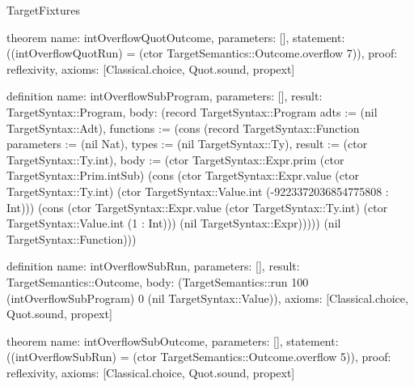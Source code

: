 \begin{lexlean}{TargetFixtures}
\begin{semanticmodule}
theorem{
  name: intOverflowQuotOutcome,
  parameters: [],
  statement: ((intOverflowQuotRun) = (ctor TargetSemantics::Outcome.overflow 7)),
  proof: reflexivity{},
  axioms: [Classical.choice, Quot.sound, propext]
}

definition{
  name: intOverflowSubProgram,
  parameters: [],
  result: TargetSyntax::Program,
  body: (record TargetSyntax::Program {adts := (nil TargetSyntax::Adt), functions := (cons (record TargetSyntax::Function {parameters := (nil Nat), types := (nil TargetSyntax::Ty), result := (ctor TargetSyntax::Ty.int), body := (ctor TargetSyntax::Expr.prim (ctor TargetSyntax::Prim.intSub) (cons (ctor TargetSyntax::Expr.value (ctor TargetSyntax::Ty.int) (ctor TargetSyntax::Value.int (-9223372036854775808 : Int))) (cons (ctor TargetSyntax::Expr.value (ctor TargetSyntax::Ty.int) (ctor TargetSyntax::Value.int (1 : Int))) (nil TargetSyntax::Expr))))}) (nil TargetSyntax::Function))})
}

definition{
  name: intOverflowSubRun,
  parameters: [],
  result: TargetSemantics::Outcome,
  body: (TargetSemantics::run 100 (intOverflowSubProgram) 0 (nil TargetSyntax::Value)),
  axioms: [Classical.choice, Quot.sound, propext]
}

theorem{
  name: intOverflowSubOutcome,
  parameters: [],
  statement: ((intOverflowSubRun) = (ctor TargetSemantics::Outcome.overflow 5)),
  proof: reflexivity{},
  axioms: [Classical.choice, Quot.sound, propext]
}


\end{semanticmodule}
\end{lexlean}
